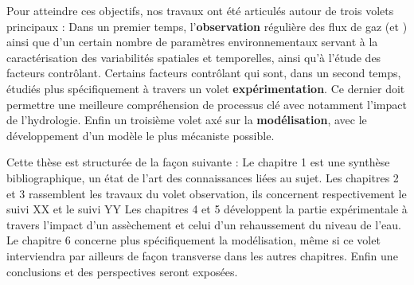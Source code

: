 \begin{linenumbers}
Pour atteindre ces objectifs, nos travaux ont été articulés autour de trois volets  principaux :
Dans un premier temps, l'\textbf{observation} régulière des flux de gaz (\COO et \CHH) ainsi que d'un certain nombre de paramètres environnementaux servant à la caractérisation des variabilités spatiales et temporelles, ainsi qu'à l'étude des facteurs contrôlant.
Certains facteurs contrôlant qui sont, dans un second temps, étudiés plus spécifiquement à travers un volet \textbf{expérimentation}.
Ce dernier doit permettre une meilleure compréhension de processus clé avec notamment l'impact de l'hydrologie.
Enfin un troisième volet axé sur la \textbf{modélisation}, avec le développement d'un modèle le plus mécaniste possible.


Cette thèse est structurée de la façon suivante :
Le chapitre 1 est une synthèse bibliographique, un état de l'art des connaissances liées au sujet.
Les chapitres 2 et 3 rassemblent les travaux du volet observation, ils concernent respectivement le suivi XX et le suivi YY 
Les chapitres 4 et 5 développent la partie expérimentale à travers l'impact d'un assèchement et celui d'un rehaussement du niveau de l'eau.
Le chapitre 6 concerne plus spécifiquement la modélisation, même si ce volet interviendra par ailleurs de façon transverse dans les autres chapitres.
Enfin une conclusions et des perspectives seront exposées.

\end{linenumbers}

%
